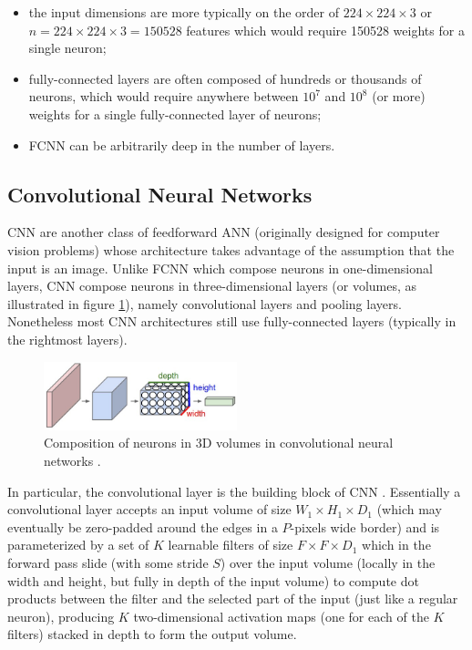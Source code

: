 \begin{itemize}
    \item the input dimensions are more typically on the order of $224 \times 224 \times 3$ or $n = 224 \times 224 \times 3 = 150528$ features which would require 150528 weights for a single neuron;
    \item fully-connected layers are often composed of hundreds or thousands of neurons, which would require anywhere between $10^7$ and $10^8$ (or more) weights for a single fully-connected layer of neurons;
    \item \ac{FCNN} can be arbitrarily deep in the number of layers.
\end{itemize}

\subsection{Convolutional Neural Networks}

\ac{CNN} are another class of feedforward \ac{ANN} (originally designed for computer vision problems) whose architecture takes advantage of the assumption that the input is an image. Unlike \ac{FCNN} which compose neurons in one-dimensional layers, \ac{CNN} compose neurons in three-dimensional layers (or volumes, as illustrated in figure \ref{fig:3dvolumes}), namely convolutional layers and pooling layers. Nonetheless most \ac{CNN} architectures still use fully-connected layers (typically in the rightmost layers).

\begin{figure}[ht]
    \centering
    \includegraphics[width=0.5\textwidth]{figs/3dvolumes.png}
    \caption{Composition of neurons in 3D volumes in convolutional neural networks \cite{cs231n}.}
    \label{fig:3dvolumes}
\end{figure}

In particular, the convolutional layer is the building block of \ac{CNN} \cite{cs231n} \cite{deeplearning}. Essentially a convolutional layer accepts an input volume of size $W_1 \times H_1 \times D_1$ (which may eventually be zero-padded around the edges in a $P$-pixels wide border) and is parameterized by a set of $K$ learnable filters of size $F \times F \times D_1$ which in the forward pass slide (with some stride $S$) over the input volume (locally in the width and height, but fully in depth of the input volume) to compute dot products between the filter and the selected part of the input (just like a regular neuron), producing $K$ two-dimensional activation maps (one for each of the $K$ filters) stacked in depth to form the output volume.

